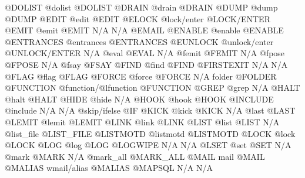 \documentclass[letterpaper,10pt,english]{sphinxmanual}
\begin{document}
\begin{description}
@DOLIST                 @dolist                        @DOLIST
@DRAIN                  @drain                         @DRAIN
@DUMP                   @dump                          @DUMP
@EDIT                   @edit                          @EDIT
@ELOCK                  @lock/enter                    @LOCK/ENTER
@EMIT                   @emit                          @EMIT
N/A                     N/A                            @EMAIL
@ENABLE                 @enable                        @ENABLE
@ENTRANCES              @entrances                     @ENTRANCES
@EUNLOCK                @unlock/enter                  @UNLOCK/ENTER
N/A                     @eval                          @EVAL
N/A                     @femit                         @FEMIT
N/A                     @fpose                         @FPOSE
N/A                     @fsay                          @FSAY
@FIND                   @find                          @FIND
@FIRSTEXIT              N/A                            N/A
@FLAG                   @flag                          @FLAG
@FORCE                  @force                         @FORCE
N/A                     folder                         @FOLDER
@FUNCTION               @function/@lfunction           @FUNCTION
@GREP                   @grep                          N/A
@HALT                   @halt                          @HALT
@HIDE                   @hide                          N/A
@HOOK                   @hook                          @HOOK
@INCLUDE                @include                       N/A
N/A                     @skip/ifelse                   @IF
@KICK                   @kick                          @KICK
N/A                     @last                          @LAST
@LEMIT                  @lemit                         @LEMIT
@LINK                   @link                          @LINK
@LIST                   @list                          @LIST
N/A                     @list\_file                     @LIST\_FILE
@LISTMOTD               @listmotd                      @LISTMOTD
@LOCK                   @lock                          @LOCK
@LOG                    @log                           @LOG
@LOGWIPE                N/A                            N/A
@LSET                   @set                           @SET
N/A                     @mark                          @MARK
N/A                     @mark\_all                      @MARK\_ALL
@MAIL                   mail                           @MAIL
@MALIAS                 wmail/alias                    @MALIAS
@MAPSQL                 N/A                            N/A

\end{description}
\end{document}
